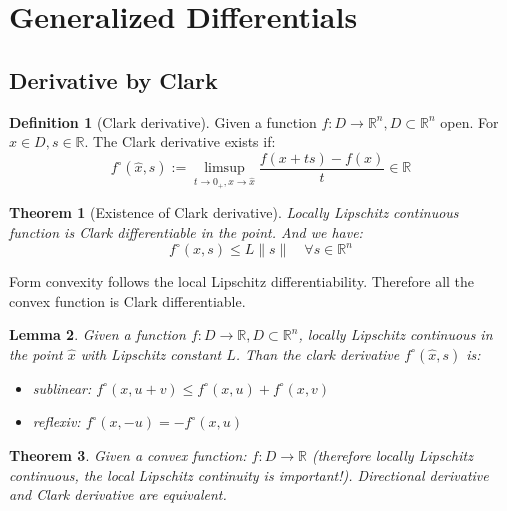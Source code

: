 \documentclass[a4paper,11pt,fleqn, draft]{book}
\newtheorem{theorem}{Theorem}[section]
\newtheorem{lemma}[theorem]{Lemma}
\theoremstyle{definition}
\newtheorem{definition}{Definition}[section]
\theoremstyle{remark}
\begin{document}
\section{Generalized Differentials}

\subsection{Derivative by Clark}
\begin{definition}[Clark derivative]
	Given a function $f:D \longrightarrow \mathbb{R}^n, D \subset \mathbb{R}^n$ open. For $\hat{x} \in D, s \in \mathbb{R}$. The Clark derivative exists if:
	\begin{equation*}
		f^\circ(\hat{x}, s) := \limsup_{t \rightarrow 0_+, x \rightarrow \hat{x}} \frac{f(x + ts) - f(x)}{t} \in \mathbb{R}
	\end{equation*}
\end{definition}

\begin{theorem}[Existence of Clark derivative]
Locally Lipschitz continuous function is Clark differentiable in the point. And we have:
\begin{equation*}
	f^\circ(x, s) \leq L \| s \| \quad \forall s \in \mathbb{R}^n
\end{equation*}
\end{theorem}

Form convexity follows the local Lipschitz differentiability. Therefore all the convex function is Clark differentiable.

\begin{lemma}
	Given a function $f: D \longrightarrow \mathbb{R}, D \subset \mathbb{R}^n$, locally Lipschitz continuous in the point $\hat{x}$ with Lipschitz constant $L$. Than the clark derivative $f^\circ(\hat{x}, s) $ is:
	\begin{itemize}
		\item sublinear: $f^\circ(x, u + v) \leq f^\circ(x, u) + f^\circ(x, v)$
		\item reflexiv: $f^\circ(x, -u) = -f^\circ(x, u)$
	\end{itemize}
\end{lemma}

\begin{theorem}
	Given a convex function: $f: D \longrightarrow \mathbb{R}$ (therefore locally Lipschitz continuous, the local Lipschitz continuity is important!). Directional derivative and Clark derivative are equivalent. 
\end{theorem}
\end{document}
